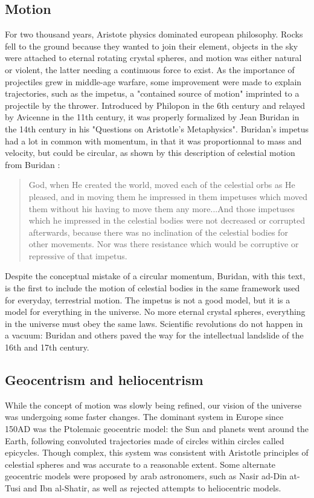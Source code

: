 \subsection*{Motion}
For two thousand years, Aristote physics dominated european philosophy. Rocks fell to the ground because they wanted to join their element, objects in the sky were attached to eternal rotating crystal spheres, and motion was either natural or violent, the latter needing a continuous force to exist. As the importance of projectiles grew in middle-age warfare, some improvement were made to explain trajectories, such as the impetus, a "contained source of motion" imprinted to a projectile by the thrower. Introduced by Philopon in the 6th century and relayed by Avicenne in the 11th century, it was properly formalized by Jean Buridan in the 14th century in his "Questions on Aristotle's Metaphysics". Buridan's impetus had a lot in common with momentum, in that it was proportionnal to mass and velocity, but could be circular, as shown by this description of celestial motion from Buridan \citep{Clagett1959}:

\begin{quote}
God, when He created the world, moved each of the celestial orbs as He pleased, and in moving them he impressed in them impetuses which moved them without his having to move them any more...And those impetuses which he impressed in the celestial bodies were not decreased or corrupted afterwards, because there was no inclination of the celestial bodies for other movements. Nor was there resistance which would be corruptive or repressive of that impetus.
\end{quote} 


Despite the conceptual mistake of a circular momentum, Buridan, with this text, is the first to include the motion of celestial bodies in the same framework used for everyday, terrestrial motion. The impetus is not a good model, but it is a model for everything in the universe. No more eternal crystal spheres, everything in the universe must obey the same laws. Scientific revolutions do not happen in a vacuum: Buridan and others paved the way for the intellectual landslide of the 16th and 17th century.

\subsection*{Geocentrism and heliocentrism}

While the concept of motion was slowly being refined, our vision of the universe was undergoing some faster changes. The dominant system in Europe since 150AD was the Ptolemaic geocentric model: the Sun and planets went around the Earth, following convoluted trajectories made of circles within circles called epicycles. Though complex, this system was consistent with Aristotle principles of celestial spheres and was accurate to a reasonable extent. Some alternate geocentric models were proposed by arab astronomers, such as Nasir ad-Din at-Tusi and Ibn al-Shatir, as well as rejected attempts to heliocentric models.

